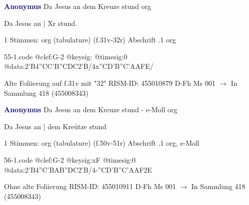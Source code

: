 \documentclass[twocolumn]{book}
\begin{document}
\newline \par \vspace{7pt} \textcolor{darkblue}{\textbf{Anonymus  }}
\newline Da Jesus an dem Kreuze stund
\newline org
\newline \begin{itshape}[f.31v, at left:] Da Jesus an | Xr stund.\end{itshape} 
\newline \textcolor{darkblue}{}  1 Stimmen: org (tabulature)  (f.31v-32r)
\newline Abschrift
.1  org  
\begin{filecontents*}{55-1.code}
@clef:G-2
@keysig:
@timesig:0
@data:2'B4''CC'B''CDC2'B/4x''CD'B''C'AAFE/
\end{filecontents*}
\newline
%
\newline Alte Foliierung auf f.31v mit "32"
\newline RISM-ID: 455010879
\newline D-Fh  Ms 001
\newline $\rightarrow$ In Sammlung 418 (455008343)
      
\newline \par \vspace{7pt} \textcolor{darkblue}{\textbf{Anonymus  }}
\newline Da Jesus an dem Kreuze stund - e-Moll
\newline org
\newline \begin{itshape}[f.50v, at left:] Da Jesus an | dem Kreütze stund\end{itshape} 
\newline \textcolor{darkblue}{}  1 Stimmen: org (tabulature)  (f.50v-51r)
\newline Abschrift
.1  org, e-Moll  
\begin{filecontents*}{56-1.code}
@clef:G-2
@keysig:xF
@timesig:0
@data:2'B4''C'BAB''DC2'B/4-''CD'B''C'AAF2E
\end{filecontents*}
\newline
%
\newline Ohne alte Foliierung
\newline RISM-ID: 455010911
\newline D-Fh  Ms 001
\newline $\rightarrow$ In Sammlung 418 (455008343)
      
\end{document}
